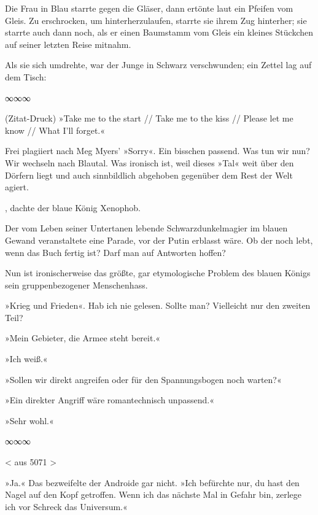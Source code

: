 Die Frau in Blau starrte gegen die Gläser, dann ertönte laut ein Pfeifen vom Gleis. Zu erschrocken, um hinterherzulaufen, starrte sie ihrem Zug hinterher; sie starrte auch dann noch, als er einen Baumstamm vom Gleis ein kleines Stückchen auf seiner letzten Reise mitnahm.

Als sie sich umdrehte, war der Junge in Schwarz verschwunden; ein Zettel lag auf dem Tisch:


\begin{center}
∞∞∞
\end{center}

(Zitat-Druck) »Take me to the start // Take me to the kiss // Please let me know // What I'll forget.«

Frei plagiiert nach Meg Myers' »Sorry«. Ein bisschen passend. Was tun wir nun? Wir wechseln nach Blautal. Was ironisch ist, weil dieses »Tal« weit über den Dörfern liegt und auch sinnbildlich abgehoben gegenüber dem Rest der Welt agiert.

, dachte der blaue König Xenophob. 

Der vom Leben seiner Untertanen lebende Schwarzdunkelmagier im blauen Gewand veranstaltete eine Parade, vor der Putin erblasst wäre. Ob der noch lebt, wenn das Buch fertig ist? Darf man auf Antworten hoffen?

Nun ist ironischerweise das größte, gar etymologische Problem des blauen Königs sein gruppenbezogener Menschenhass.

»Krieg und Frieden«. Hab ich nie gelesen. Sollte man? Vielleicht nur den zweiten Teil?

»Mein Gebieter, die Armee steht bereit.«

»Ich weiß.«

»Sollen wir direkt angreifen oder für den Spannungsbogen noch warten?«

»Ein direkter Angriff wäre romantechnisch unpassend.«

»Sehr wohl.«

\begin{center}
∞∞∞
\end{center}



< aus 5071 >

»Ja.« Das bezweifelte der Androide gar nicht. »Ich befürchte nur, du hast den Nagel auf den Kopf getroffen. Wenn ich das nächste Mal in Gefahr bin, zerlege ich vor Schreck das Universum.«

